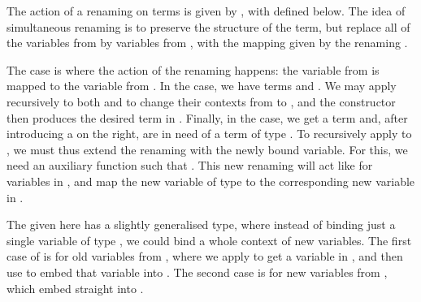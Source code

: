 \Ren{}

The action of a renaming \AgdaBound{$\rho$} on terms is given by
\AgdaSpace{}\AgdaBound{$\rho$}, with 
defined below.
The idea of simultaneous renaming is to preserve the structure of the term, but
replace all of the variables from \AgdaBound{$\Delta$} by variables from
\AgdaBound{$\Gamma$}, with the mapping given by the renaming \AgdaBound{$\rho$}.

\rename{}

The  case is where the action of the renaming
happens: the variable  from \AgdaBound{$\Delta$} is mapped to the
variable \AgdaBound{$\rho$}\AgdaSpace{} from \AgdaBound{$\Gamma$}.
In the  case, we have terms 
\AgdaSymbol{:} \AgdaBound{$\Delta$} \AgdaDatatype{$\vdash$}
   and 
\AgdaSymbol{:} \AgdaBound{$\Delta$} \AgdaDatatype{$\vdash$} .
We may apply  \AgdaBound{$\rho$} recursively to both
 and  to change their contexts from
\AgdaBound{$\Delta$} to \AgdaBound{$\Gamma$}, and the
 constructor then produces the desired term in
\AgdaBound{$\Gamma$}.
Finally, in the  case, we get a term
 \AgdaSymbol{:} \DA{} \AgdaDatatype{$\vdash$}  and,
after introducing a  on the right, are in need
of a term of type \GA{} \AgdaDatatype{$\vdash$} .
To recursively apply  to , we must thus extend
the renaming \AgdaBound{$\rho$} \AgdaSymbol{:} \RenGD{} with the newly bound
variable.
For this, we need an auxiliary function  such that
 \AgdaBound{$\rho$} \AgdaSymbol{:} \RenGADA{}.
This new renaming will act like \AgdaBound{$\rho$} for variables in
\AgdaBound{$\Delta$}, and map the new variable of type  to the
corresponding new variable in \GA{}.

\bindRen{}

The  given here has a slightly generalised type, where
instead of binding just a single variable of type , we could
bind a whole context \AgdaBound{$\Theta$} of new variables.
The first case of  is for old variables from
\AgdaBound{$\Delta$}, where we apply \AgdaBound{$\rho$} to get a variable in
\AgdaBound{$\Gamma$}, and then use  to embed that variable
into \GTh{}.
The second case is for new variables from \AgdaBound{$\Theta$}, which embed
straight into \GTh{}.

